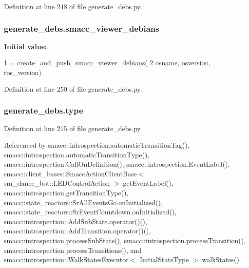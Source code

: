 Definition at line 248 of file generate\+\_\+debs.\+py.

\subsubsection[{\texorpdfstring{smacc\+\_\+viewer\+\_\+debians}{smacc_viewer_debians}}]{\setlength{\rightskip}{0pt plus 5cm}generate\+\_\+debs.\+smacc\+\_\+viewer\+\_\+debians}\hypertarget{namespacegenerate__debs_a545b249defac1bf82a09872513263f61}{}\label{namespacegenerate__debs_a545b249defac1bf82a09872513263f61}
{\bfseries Initial value\+:}
\begin{DoxyCode}
1 = \hyperlink{namespacegenerate__debs_a9a6167ed98fbdc7b1e1c56da5652cf19}{create\_and\_push\_smacc\_viewer\_debians}(
2         osname, osversion, ros\_version)
\end{DoxyCode}


Definition at line 250 of file generate\+\_\+debs.\+py.

\subsubsection[{\texorpdfstring{type}{type}}]{\setlength{\rightskip}{0pt plus 5cm}generate\+\_\+debs.\+type}\hypertarget{namespacegenerate__debs_a50bc9a7ecac9584553e089a448bcde58}{}\label{namespacegenerate__debs_a50bc9a7ecac9584553e089a448bcde58}


Definition at line 215 of file generate\+\_\+debs.\+py.



Referenced by smacc\+::introspection.\+automatic\+Transition\+Tag(), smacc\+::introspection.\+automatic\+Transition\+Type(), smacc\+::introspection.\+Call\+On\+Definition(), smacc\+::introspection.\+Event\+Label(), smacc\+::client\+\_\+bases\+::\+Smacc\+Action\+Client\+Base$<$ sm\+\_\+dance\+\_\+bot\+::\+L\+E\+D\+Control\+Action $>$.\+get\+Event\+Label(), smacc\+::introspection.\+get\+Transition\+Type(), smacc\+::state\+\_\+reactors\+::\+Sr\+All\+Events\+Go.\+on\+Initialized(), smacc\+::state\+\_\+reactors\+::\+Sr\+Event\+Countdown.\+on\+Initialized(), smacc\+::introspection\+::\+Add\+Sub\+State.\+operator()(), smacc\+::introspection\+::\+Add\+Transition.\+operator()(), smacc\+::introspection.\+process\+Sub\+State(), smacc\+::introspection.\+process\+Transition(), smacc\+::introspection.\+process\+Transitions(), and smacc\+::introspection\+::\+Walk\+States\+Executor$<$ Initial\+State\+Type $>$.\+walk\+States().

